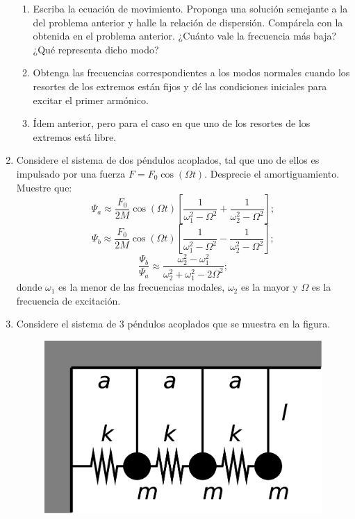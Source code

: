 \documentclass[11pt,spanish,a4paper]{article}
\begin{document}
\begin{enumerate}
\begin{enumerate}
\item Escriba la ecuación de movimiento. Proponga una solución semejante
a la del problema anterior y halle la relación de dispersión. Compárela
con la obtenida en el problema anterior. ¿Cuánto vale la frecuencia
más baja? ¿Qué representa dicho modo? 
\item Obtenga las frecuencias correspondientes a los modos normales cuando
los resortes de los extremos están fijos y dé las condiciones iniciales
para excitar el primer armónico. 
\item Ídem anterior, pero para el caso en que uno de los resortes de los
extremos está libre. 
\end{enumerate}
\item Considere el sistema de dos péndulos acoplados, tal que uno de ellos
es impulsado por una fuerza $F=F_{0}\cos(\Omega t)$. Desprecie el
amortiguamiento. Muestre que:
\[
\Psi_{a}\approx\frac{F_{0}}{2M}\cos(\Omega t)\left[\frac{1}{\omega_{1}^{2}-\Omega^{2}}+\frac{1}{\omega_{2}^{2}-\Omega^{2}}\right];
\]
\[
\Psi_{b}\approx\frac{F_{0}}{2M}\cos(\Omega t)\left[\frac{1}{\omega_{1}^{2}-\Omega^{2}}-\frac{1}{\omega_{2}^{2}-\Omega^{2}}\right];
\]
\[
\frac{\Psi_{b}}{\Psi_{a}}\approx\frac{\omega_{2}^{2}-\omega_{1}^{2}}{\omega_{2}^{2}+\omega_{1}^{2}-2\Omega^{2}};
\]
donde $\omega_{1}$ es la menor de las frecuencias modales, $\omega_{2}$
es la mayor y $\Omega$ es la frecuencia de excitación.
\item Considere el sistema de 3 péndulos acoplados que se muestra en la
figura.
\begin{figure}[H]
\centering{}\includegraphics[clip,scale=0.25]{ej1-14}
\end{figure}



\end{enumerate}
\end{document}
